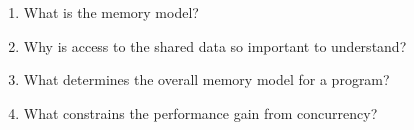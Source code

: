 \begin{enumerate}
\item What is the memory model?
\item Why is access to the shared data so important to understand?
\item What determines the overall memory model for a program?
\item What constrains the performance gain from concurrency?
\end{enumerate}